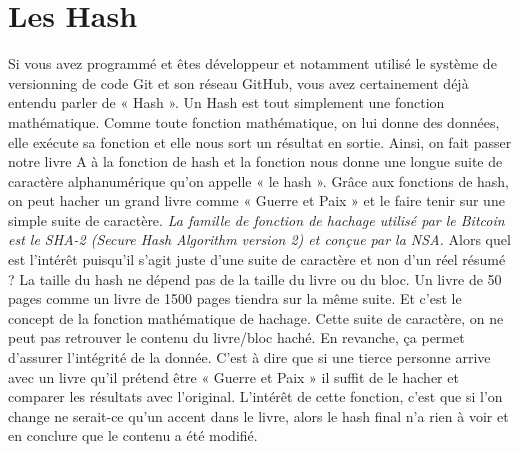 \documentclass{bredele} %
\begin{document}
    \section*{Les Hash}
    Si vous avez programmé et êtes développeur et notamment utilisé le système de versionning de code Git et son réseau GitHub, vous avez certainement déjà entendu parler de « Hash ».
    \newline
    Un Hash est tout simplement une fonction mathématique. Comme toute fonction mathématique, on lui donne des données, elle exécute sa fonction et elle nous sort un résultat en sortie. Ainsi, on fait passer notre livre A à la fonction de hash et la fonction nous donne une longue suite de caractère alphanumérique qu’on appelle « le hash ».
    \newline
    Grâce aux fonctions de hash, on peut hacher un grand livre comme « Guerre et Paix » et le faire tenir sur une simple suite de caractère.
    \newline
    \newline
    \textit{La famille de fonction de hachage utilisé par le Bitcoin est le SHA-2 (Secure Hash Algorithm version 2) et conçue par la NSA. }
    \newline
    \newline
    Alors quel est l’intérêt puisqu’il s’agit juste d’une suite de caractère et non d’un réel résumé ?
    \newline
    La taille du hash ne dépend pas de la taille du livre ou du bloc. Un livre de 50 pages comme un livre de 1500 pages tiendra sur la même suite. Et c’est le concept de la fonction mathématique de hachage.
    \newline
    \newline
    Cette suite de caractère, on ne peut pas retrouver le contenu du livre/bloc haché. En revanche, ça permet d’assurer l’intégrité de la donnée.
    \newline
    C’est à dire que si une tierce personne arrive avec un livre qu’il prétend être « Guerre et Paix » il suffit de le hacher et comparer les résultats avec l’original.
    \newline
    L’intérêt de cette fonction, c’est que si l’on change ne serait-ce qu’un accent dans le livre, alors le hash final n’a rien à voir et en conclure que le contenu a été modifié.
\end{document}
